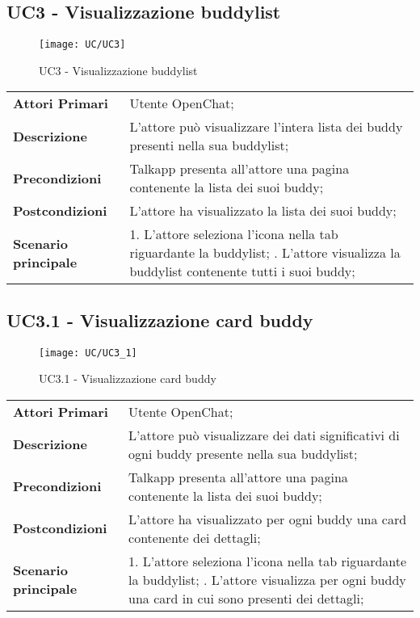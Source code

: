 \subsection{UC3 - Visualizzazione buddylist}
	\begin{figure}[H] 
	\centering
	\texttt{[image: UC/UC3]}
	\caption{UC3 - Visualizzazione buddylist}
\end{figure}
	\begin{center}
	\bgroup
	\def\arraystretch{1.8}     
	\begin{longtable}{  p{4cm} | p{9.5cm} } 
		\textbf{Attori Primari} & Utente OpenChat; \\ 
		\textbf{Descrizione} &  L'attore può visualizzare l'intera lista dei buddy presenti nella sua buddylist; \\ 
		\textbf{Precondizioni}  & Talkapp presenta all'attore una pagina contenente la lista dei suoi buddy; \\
		\textbf{Postcondizioni} & L'attore ha visualizzato la lista dei suoi buddy;  \\ 
		\textbf{Scenario principale} & 
		1. L'attore seleziona l'icona nella tab riguardante la buddylist; \newline
		2. L'attore visualizza la buddylist contenente tutti i suoi buddy;
	\end{longtable}
	\egroup
\end{center}

\subsection{UC3.1 - Visualizzazione card buddy}
	\begin{figure}[H] 
	\centering
	\texttt{[image: UC/UC3\_1]}
	\caption{UC3.1 - Visualizzazione card buddy}
\end{figure}
		\begin{center}
		\bgroup
		\def\arraystretch{1.8}     
		\begin{longtable}{  p{4cm} | p{9.5cm} } 
			\textbf{Attori Primari} & Utente OpenChat; \\ 
			\textbf{Descrizione} &  L'attore può visualizzare dei dati significativi di ogni buddy presente nella sua buddylist; \\ 
			\textbf{Precondizioni}  & Talkapp presenta all'attore una pagina contenente la lista dei suoi buddy; \\
			\textbf{Postcondizioni} & L'attore ha visualizzato per ogni buddy una card contenente dei dettagli;  \\ 
			\textbf{Scenario principale} & 
			1. L'attore seleziona l'icona nella tab riguardante la buddylist; \newline
			2. L'attore visualizza per ogni buddy una card in cui sono presenti dei dettagli;
		\end{longtable}
		\egroup
	\end{center}

